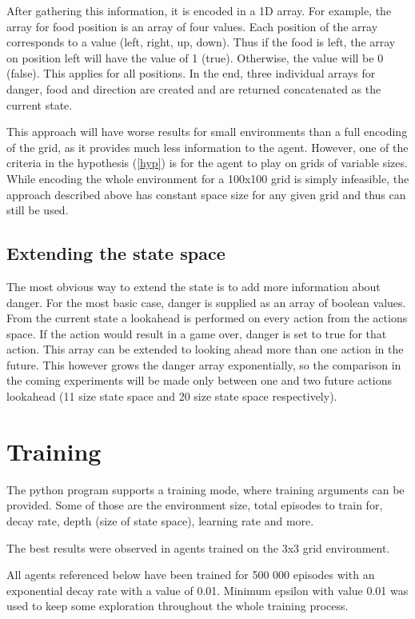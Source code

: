 \documentclass[lettersize,journal]{IEEEtran}
\begin{document}
After gathering this information, it is encoded in a 1D array. For example, the array for food position
is an array of four values. Each position of the array corresponds to a value (left, right, up, down).
Thus if the food is left, the array on position left will have the value of 1 (true). Otherwise, the
value will be 0 (false). This applies for all positions. In the end, three individual arrays for danger,
food and direction are created and are returned concatenated as the current state.


This approach will have worse results for small environments than a full encoding of the grid, as it provides
much less information to the agent. However, one of the criteria in the hypothesis (\ref{hyp}) is for the
agent to play on grids of variable sizes. While encoding the whole environment for a 100x100 grid is
simply infeasible, the approach described above has constant space size for any given grid and thus can still
be used.

\subsection{Extending the state space}
The most obvious way to extend the state is to add more
information about danger. For the most basic case, danger
is supplied as an array of boolean values. From the current
state a lookahead is performed on every action from
the actions space. If the action would result in a game
over, danger is set to true for that action. This
array can be extended to looking ahead more than one action
in the future. This however grows the danger array
exponentially, so the comparison in the coming experiments
will be made only between one and two future actions lookahead
(11 size state space and 20 size state space respectively).


\section{Training} \label{training}
The python program supports a training mode, where
training arguments can be provided. Some of those are the environment size,
total episodes to train for, decay rate, depth (size of state space),
learning rate and more.

The best results were observed in agents trained on the 3x3 grid environment.

All agents referenced below have been trained for 500 000 episodes
with an exponential decay rate with a value of 0.01. Minimum epsilon with value 0.01
was used to keep some exploration throughout the whole training
process.
\end{document}
